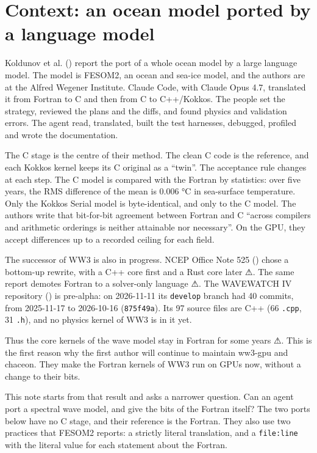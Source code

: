 \documentclass[10pt,a4paper,]{article}
\begin{document}
\setcounter{section}{-1}

\section{Context: an ocean model ported by a language
model}\label{sec:context}

Koldunov et al. ()
report the port of a whole ocean model by a large language model. The
model is FESOM2, an ocean and sea-ice model, and the authors are at the
Alfred Wegener Institute. Claude Code, with Claude Opus 4.7, translated
it from Fortran to C and then from C to C++/Kokkos. The people set the
strategy, reviewed the plans and the diffs, and found physics and
validation errors. The agent read, translated, built the test harnesses,
debugged, profiled and wrote the documentation.

The C stage is the centre of their method. The clean C code is the
reference, and each Kokkos kernel keeps its C original as a ``twin''.
The acceptance rule changes at each step. The C model is compared with
the Fortran by statistics: over five years, the RMS difference of the
mean is 0.006 °C in sea-surface temperature. Only the Kokkos Serial
model is byte-identical, and only to the C model. The authors write that
bit-for-bit agreement between Fortran and C ``across compilers and
arithmetic orderings is neither attainable nor necessary''. On the GPU,
they accept differences up to a recorded ceiling for each field.

The successor of WW3 is also in progress. NCEP Office Note 525
() chose a bottom-up rewrite, with a
C++ core first and a Rust core later ⚠. The same report demotes Fortran
to a solver-only language ⚠. The WAVEWATCH IV repository
() is
pre-alpha: on 2026-11-11 its \texttt{develop} branch had 40 commits,
from 2025-11-17 to 2026-10-16 (\texttt{875f49a}). Its 97 source files
are C++ (66 \texttt{.cpp}, 31 \texttt{.h}), and no physics kernel of WW3
is in it yet.

Thus the core kernels of the wave model stay in Fortran for some years
⚠. This is the first reason why the first author will continue to
maintain ww3-gpu and chaceon. They make the Fortran kernels of WW3 run
on GPUs now, without a change to their bits.

This note starts from that result and asks a narrower question. Can an
agent port a spectral wave model, and give the bits of the Fortran
itself? The two ports below have no C stage, and their reference is the
Fortran. They also use two practices that FESOM2 reports: a strictly
literal translation, and a \texttt{file:line} with the literal value for
each statement about the Fortran.
\end{document}
